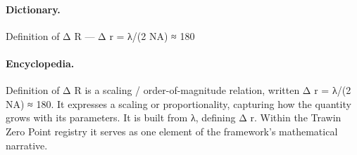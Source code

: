 \paragraph{Dictionary.}
Definition of Δ R — Δ r = λ/(2 NA) ≈ 180

\paragraph{Encyclopedia.}
Definition of Δ R is a scaling / order-of-magnitude relation, written Δ r = λ/(2 NA) ≈ 180. It expresses a scaling or proportionality, capturing how the quantity grows with its parameters. It is built from λ, defining Δ r. Within the Trawin Zero Point registry it serves as one element of the framework's mathematical narrative.
